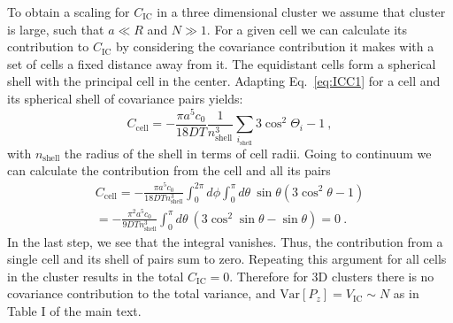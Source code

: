 To obtain a scaling for $C_\text{IC}$ in a three dimensional cluster we assume that cluster is large, such that $a \ll R$ and $N \gg 1$. For a given cell we can calculate its contribution to $C_\text{IC}$ by considering the covariance contribution it makes with a set of cells a fixed distance away from it. The equidistant cells form a spherical shell with the principal cell in the center. Adapting Eq.\ \ref{eq:ICC1} for a cell and its spherical shell of covariance pairs yields:
\begin{equation}
    C_\text{cell} = -\frac{\pi a^5c_0}{18DT} \frac{1}{n_\text{shell}^3} \sum_{i_\text{shell}} 3\cos^2\Theta_{i}-1 \ ,
\end{equation}
with $n_\text{shell}$ the radius of the shell in terms of cell radii.
Going to continuum we can calculate the contribution from the cell and all its pairs
\begin{equation}
\begin{split}
    C_\text{cell} = -\frac{\pi a^5c_0}{18DT n_\text{shell}^3} \int_0^{2\pi} d\phi \int_0^{\pi} d\theta \ \sin\theta (3\cos^2\theta-1) \\
    = -\frac{\pi^2 a^5c_0}{9DT n_\text{shell}^3} \int_0^\pi d\theta \ (3\cos^2\sin\theta - \sin\theta) = 0 \ .
\end{split}
\end{equation}
In the last step, we see that the integral vanishes. Thus, the contribution from a single cell and its shell of pairs sum to zero. Repeating this argument for all cells in the cluster results in the total $C_\text{IC} = 0$. Therefore for 3D clusters there is no covariance contribution to the total variance, and $\text{Var}[P_z] = V_\text{IC} \sim N$ as in Table I of the main text.


